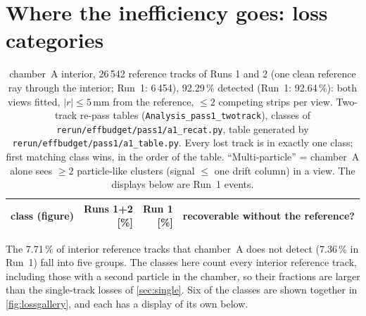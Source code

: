 \section{Where the inefficiency goes: loss categories}\label{app:losses}

\begin{table}[tbp]
  \centering\small
  \caption{chamber~A interior, 26\,542 reference tracks of Runs 1 and 2 (one clean reference ray through the interior; Run~1: 6\,454),
  92.29\,\% detected (Run~1: 92.64\,\%): both views fitted, $|r|\le5$\,mm from the reference, $\le2$ competing strips per
  view. Two-track re-pass tables (\texttt{Analysis\_pass1\_twotrack}), classes of \texttt{rerun/effbudget/pass1/a1\_recat.py},
  table generated by \texttt{rerun/effbudget/pass1/a1\_table.py}. Every lost track is in exactly
  one class; first matching class wins, in the order of the table. ``Multi-particle'' = chamber~A alone sees $\ge2$
  particle-like clusters (signal $\le$ one drift column) in a view. The displays below are Run~1 events.}
  \label{tab:losses}
  \begin{tabular}{p{5.3cm}rrp{6.6cm}}
    \hline
    class (figure) & \shortstack{Runs 1+2\\{}[\%]} & \shortstack{Run 1\\{}[\%]} & recoverable without the reference? \\
    \hline
  \end{tabular}
\end{table}

The 7.71\,\% of interior reference tracks that chamber~A does not detect (7.36\,\% in Run~1) fall into five groups.
The classes here count every interior reference track, including those with a second particle in the chamber, so
their fractions are larger than the single-track losses of \cref{sec:single}. Six of the classes are shown together
in \cref{fig:lossgallery}, and each has a display of its own below.

